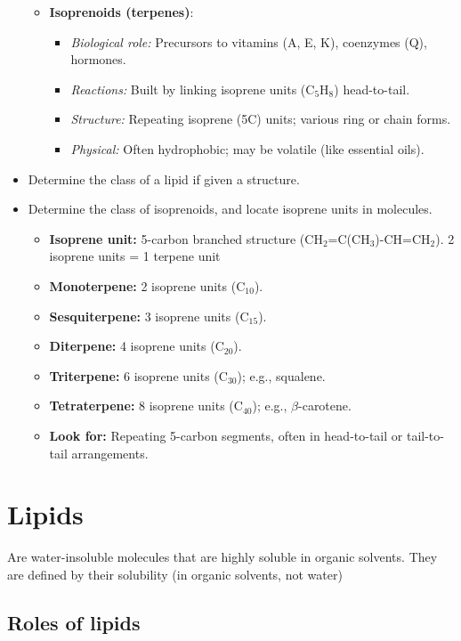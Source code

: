 \documentclass[letterpaper, 12pt]{article}
\begin{document}
\begin{itemize}
\begin{itemize}
    \item \textbf{Isoprenoids (terpenes)}:
    \begin{itemize}
        \item \textit{Biological role:} Precursors to vitamins (A, E, K), coenzymes (Q), hormones.
        \item \textit{Reactions:} Built by linking isoprene units (C$_5$H$_8$) head-to-tail.
        \item \textit{Structure:} Repeating isoprene (5C) units; various ring or chain forms.
        \item \textit{Physical:} Often hydrophobic; may be volatile (like essential oils).
    \end{itemize}
\end{itemize}
\item  Determine the class of a lipid if given a structure.
\item Determine the class of isoprenoids, and locate isoprene units in molecules.
\begin{itemize}
    \item \textbf{Isoprene unit:} 5-carbon branched structure (CH$_2$=C(CH$_3$)-CH=CH$_2$). 2 isoprene units = 1 terpene unit
    \item \textbf{Monoterpene:} 2 isoprene units (C$_{10}$).
    \item \textbf{Sesquiterpene:} 3 isoprene units (C$_{15}$).
    \item \textbf{Diterpene:} 4 isoprene units (C$_{20}$).
    \item \textbf{Triterpene:} 6 isoprene units (C$_{30}$); e.g., squalene.
    \item \textbf{Tetraterpene:} 8 isoprene units (C$_{40}$); e.g., $\beta$-carotene.
    \item \textbf{Look for:} Repeating 5-carbon segments, often in head-to-tail or tail-to-tail arrangements.
    \end{itemize}

\end{itemize}

\newpage

\section*{Lipids}
Are water-insoluble molecules that are highly soluble in organic solvents. They are defined by their solubility (in organic solvents, not water)

\subsection*{Roles of lipids}
\end{document}
